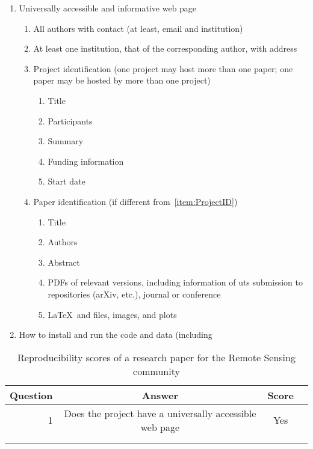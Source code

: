 \documentclass[journal]{IEEEtran}
\begin{document}
\begin{enumerate}
    \item Universally accessible and informative web page
    \begin{enumerate}
        \item All authors with contact (at least, email and institution)
        \item At least one institution, that of the corresponding author, with address
        \item\label{item:ProjectID} Project identification (one project may host more than one paper; one paper may be hosted by more than one project)
        \begin{enumerate}
            \item Title
            \item Participants
            \item Summary
            \item Funding information
            \item Start date
        \end{enumerate}
        \item Paper identification (if different from~\ref{item:ProjectID})
        \begin{enumerate}
            \item Title
            \item Authors
            \item Abstract
            \item PDFs of relevant versions, including information of uts submission to repositories (arXiv, etc.), journal or conference
            \item\label{item:SourceDocumentF} \LaTeX\ and \BibTeX files, images, and plots
        \end{enumerate}
    \end{enumerate}
    \item How to install and run the code and data (including 
\end{enumerate}


\begin{table*}[hbt]
    \centering
    \caption{Reproducibility scores of a research paper for the Remote Sensing community}
    \label{tab:my_label}
    \begin{tabular}{rccc}\toprule
Question    & Answer & Score \\ \midrule
1           & Does the project have a universally accessible web page & Yes & \\ 
         &  \\
         & \\ \bottomrule
    \end{tabular}
\end{table*}
\end{document}
